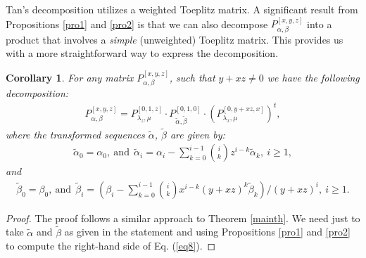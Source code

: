 \documentclass{amsart}
\newtheorem{corollary}{Corollary}
\begin{document}
Tan's decomposition utilizes a weighted Toeplitz matrix. A significant result from Propositions \ref{pro1} and \ref{pro2} is that we can also decompose $P_{\alpha, \beta}^{[x, y, z]}$ into a product that involves a \emph{simple} (unweighted) Toeplitz matrix. This provides us with a more straightforward way to express the decomposition.
\begin{corollary} \label{C1}
For any matrix $P_{\alpha, \beta}^{[x, y, z]}$, such that $y+xz\neq 0$ we have the following decomposition:
\begin{align}\label{eq8}
P_{\alpha, \beta}^{[x, y, z]}=P_{\lambda_z, \mu}^{[0, 1, z]}\cdot  P_{\widetilde{\alpha}, \widetilde{\beta}}^{[0, 1, 0]} \cdot (P_{\lambda_x, \mu}^{[0, y+xz, x]})^t,
\end{align}
where the transformed sequences $\widetilde{\alpha}$, $\widetilde{\beta}$ are given by:
\begin{align}\label{eq9} \widetilde{\alpha}_{0}=\alpha_0, \ \text{and} \ \  \widetilde{\alpha}_{i}=\alpha_i-\sum_{k=0}^{i-1}\binom{i}{k} z^{i-k} \widetilde{\alpha}_k, \   i\geq 1,
\end{align}
and 
 \begin{align}\label{eq10} \widetilde{\beta}_{0}=\beta_0, \  \text{and} \ \  \widetilde{\beta}_{i}=\left(\beta_i - \sum_{k=0}^{i-1} \binom{i}{k} x^{i-k} (y+xz)^k \widetilde{\beta}_k\right)/(y+xz)^i, \  i\geq 1.\end{align}
\end{corollary}
\begin{proof}
The proof follows a similar approach to Theorem \ref{mainth}. We need just to take $\widetilde{\alpha}$ and $\widetilde{\beta}$ as given in the statement and  using Propositions \ref{pro1} and  \ref{pro2} to compute the right-hand side of Eq. (\ref{eq8}).
\end{proof}
\end{document}
